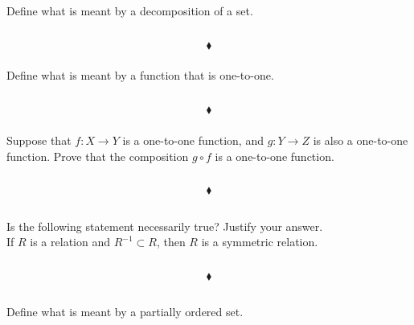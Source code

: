 \subsubsection{}
\begin{tcolorbox}
Define what is meant by a decomposition of a set.
\end{tcolorbox}
$$ $$

$$\blacklozenge$$

\subsubsection{}
\begin{tcolorbox}
Define what is meant by a function that is one-to-one.
\end{tcolorbox}
$$ $$

$$\blacklozenge$$

\subsubsection{}
\begin{tcolorbox}
Suppose that $f:X\rightarrow Y$ is a one-to-one function, and $g: Y \rightarrow Z$ is also a one-to-one function. Prove that the composition $g \circ f$ is a one-to-one function. 

\end{tcolorbox}
$$ $$

$$\blacklozenge$$


\renewcommand{\thesubsection}{\thesection.\RomanNumeralCaps{9}}
\subsection{}
\begin{tcolorbox}
Is the following statement necessarily true? Justify your answer.\\ If $R$ is a relation and $R^{-1} \subset R$, then $R$ is a symmetric relation. 
\end{tcolorbox}
$$ $$

$$\blacklozenge$$

\renewcommand{\thesubsection}{\thesection.\RomanNumeralCaps{10}}
\subsection{}
\subsubsection{}
\begin{tcolorbox}
Define what is meant by a partially ordered set.
\end{tcolorbox}
$$ $$

